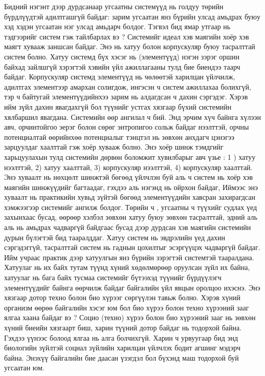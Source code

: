 Бидний нэгэнт дээр дурдсанаар угсаатны системүүд нь голдуу төрийн бүрдлүүдтэй адилтгашгүй байдаг: зарим угсаатан янз бүрийн улсад амьдрах буюу хэд хэдэн угсаатан нэг улсад амьдарч болдог. Тэгвэл бид ямар утгаар нь тэдгээрийг систем гэж тайлбарлах вэ ?
Системийг идеал хэв маягийн хоёр хэв маягт хувааж заншсан байдаг. Энэ нь хатуу болон корпускуляр буюу тасралттай систем болно. Хатуу системд бүх хэсэг нь (элементүүд) нэгэн зэрэг оршин байхад зайлшгүй хэрэгтэй хэвийн үйл ажиллагааны тулд бие биендээ таарч байдаг. Корпускуляр системд элементүүд нь чөлөөтэй харилцан үйлчилж, адилтгах элементээр амархан солигдож, ингэсэн ч систем ажиллахаа болихгүй, тэр ч байтугай элементүүдийнхээ зарим нь алдагдсан ч дахин сэргэдэг. Хэрэв ийм зүйл дахин явагдахгүй бол түүнийг устгах хязгаар бүхий системийн хялбаршил явагдана.
Системийн өөр ангилал ч бий. Энд эрчим хүч байнга хүлээн авч, орчинтойгоо эерэг болон сөрөг энтропигоо сольж байдаг нээлттэй, орчны потенциалтай өөрийнхөө потенциалыг тэнцтэл нь зөвхөн анхдагч цэнэгээ зарцуулдаг хаалттай гэж хоёр хувааж болно. Энэ хоёр шинж тэмдгийг харьцуулахын тулд системийн дөрвөн боломжит хувилбарыг авч үзье : 1 ) хатуу нээлттэй, 2) хатуу хаалттай, 3) корпускуляр нээлттэй, 4) корпускуляр хаалттай. Энэ хуваалт нь нөхцөлт шинжтэй бөгөөд үйлчлэн буй аль ч систем нь хоёр хэв маягийн шинжүүдийг багтаадаг, гэхдээ аль нэгэнд нь ойрхон байдаг, Иймээс энэ хуваалт нь практикийн хувьд зүйтэй бөгөөд элементүүдийн хавсран захирагдсан хэмжээгээр системийг ангилж болдог.
Төрийн ч , угсаатны ч түүхийг судлах үед захынхаас бусад, өөрөөр хэлбэл зөвхөн хатуу буюу зөвхөн тасралттай, эдний аль аль нь амьдрах чадваргүй байдгаас бусад дээр дурдсан хэв маягийн системийн дурын бүлэгтэй бид тааралддаг. Хатуу систем нь эвдрэлийн үед дахин сэргэдэггүй, тасралттай систем нь гаднын цохилтыг эсэргүүцэх чадваргүй байдаг. Ийм учраас практик дээр хатуулгын янз бүрийн зэрэгтэй системтэй тааралдана. Хатуулаг нь их байх тутам түүнд хүний хөдөлмөрөөр оруулсан зүйл их байна, хатуулаг нь бага байх тусмаа системийг бүтээхэд түүнийг бүрдүүлэгч элементүүдийг байнга өөрчилж байдаг байгалийн үйл явцын оролцоо ихэснэ. Энэ хязгаар дотор техно болон био хүрээг сөргүүлэн тавьж болно.
Хэрэв хүний организм өөрөө байгалийн хэсэг юм бол био хүрээ болон техно хүрээний зааг ялгаа хаана байдаг вэ ? Социо (техно) хүрээ болон био хүрээний зааг нь зөвхөн хүний биеийн хязгаарт биш, харин түүний дотор байдаг нь тодорхой байна. Гэхдээ үүнээс болоод ялгаа нь алга болчихгүй. Харин ч урвуугаар бид энд биологийн зүйлтэй социал зүйлийн харилцан үйлчлэх бодит агшинг мэдэрч байна. Энэхүү байгалийн бие даасан үзэгдэл бол бүхэнд маш тодорхой буй угсаатан юм.
